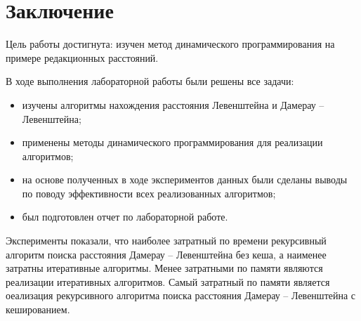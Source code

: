 \chapter*{Заключение}

Цель работы достигнута: изучен метод динамического программирования на примере редакционных расстояний.

В ходе выполнения лабораторной работы были решены все задачи:
\begin{itemize}
	\item изучены алгоритмы нахождения расстояния Левенштейна и Дамерау -- Левенштейна;
	\item применены методы динамического программирования для реализации алгоритмов;
	\item на основе полученных в ходе экспериментов данных были сделаны выводы по поводу эффективности всех реализованных алгоритмов;
	\item был подготовлен отчет по лабораторной работе.
\end{itemize}

Эксперименты показали, что наиболее затратный по времени рекурсивный алгоритм поиска расстояния Дамерау -- Левенштейна без кеша, а наименее затратны итеративные алгоритмы. Менее затратными по памяти являются реализации итеративных алгоритмов. Самый затратный по памяти является оеализация рекурсивного алгоритма поиска расстояния Дамерау -- Левенштейна с кешированием. 